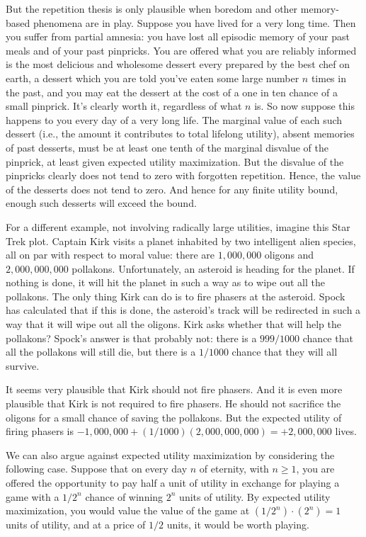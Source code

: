 But the repetition thesis is only plausible when boredom and other memory-based phenomena are in play. Suppose you have 
lived for a very long time. Then you suffer from partial amnesia: you have
lost all episodic memory of your past meals and of your past pinpricks. You are offered what you are reliably informed is 
the most delicious and wholesome dessert every prepared by the best chef on earth, a dessert  which you are told you've eaten some large 
number $n$ times in the past, and you may eat the dessert at the cost of a one in ten chance of a small pinprick. It's clearly worth it,
regardless of what $n$ is. So now suppose this happens to you every day of a very long life. The marginal value of each such 
dessert (i.e., the amount it contributes to total lifelong utility), absent memories of past desserts, must  be at least one 
tenth of the marginal disvalue of the pinprick, at least given expected  utility maximization. But the disvalue of the pinpricks 
clearly does not tend to zero with forgotten repetition. Hence, the value of the desserts does not tend to zero. And hence for any
finite utility bound, enough such desserts will exceed the bound.

For a different example, not involving radically large utilities, imagine this Star Trek plot. Captain Kirk visits a planet inhabited
by two intelligent alien species, all on par with respect to moral value: there are $1,000,000$ oligons and 
$2,000,000,000$ pollakons. Unfortunately, an asteroid is heading for the planet. If nothing is done, it will hit the planet in such
a way as to wipe out all the pollakons. The only thing Kirk can do is to fire phasers at the asteroid. Spock has calculated that if this
is done, the asteroid's track will be redirected in such a way that it will wipe out all the oligons. Kirk asks whether that will help 
the pollakons? Spock's answer is that probably not: there is a $999/1000$ chance that all the pollakons will still die, but there is
a $1/1000$ chance that they will all survive. 

It seems very plausible that Kirk should not fire phasers. And it is even more plausible that Kirk is not required to fire phasers.
He should not sacrifice the oligons for a small chance of saving the pollakons. 
But the expected utility of firing phasers is $-1,000,000+(1/1000)(2,000,000,000)=+2,000,000$ lives.

We can also argue against expected utility maximization by considering the following case. Suppose that on every day $n$ of
eternity, with $n\ge 1$, you are offered the opportunity to pay half a unit of utility in exchange for playing a game with a 
$1/2^n$ chance of winning $2^n$ units of utility. By expected utility maximization, you would value the value of the game at
$(1/2^n)\cdot (2^n)=1$ units of utility, and at a price of $1/2$ units, it would be worth playing. 

